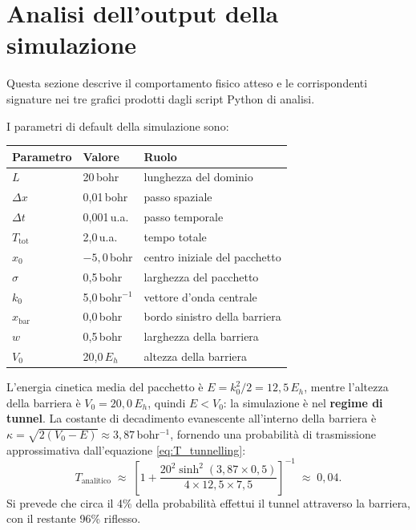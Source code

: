 \documentclass[12pt, a4paper]{article}
\newcommand{\dt}{\Delta t}
\newcommand{\dx}{\Delta x}
\begin{document}
\section{Analisi dell'output della simulazione}

Questa sezione descrive il comportamento fisico atteso e le corrispondenti
signature nei tre grafici prodotti dagli script Python di analisi.

I parametri di default della simulazione sono:
\begin{center}
\begin{tabular}{lll}
\hline
Parametro & Valore & Ruolo \\
\hline
$L$ & 20\,bohr & lunghezza del dominio \\
$\dx$ & 0,01\,bohr & passo spaziale \\
$\dt$ & 0,001\,u.a. & passo temporale \\
$T_\text{tot}$ & 2,0\,u.a. & tempo totale \\
$x_0$ & $-5{,}0$\,bohr & centro iniziale del pacchetto \\
$\sigma$ & 0,5\,bohr & larghezza del pacchetto \\
$k_0$ & 5,0\,bohr$^{-1}$ & vettore d'onda centrale \\
$x_\text{bar}$ & 0,0\,bohr & bordo sinistro della barriera \\
$w$ & 0,5\,bohr & larghezza della barriera \\
$V_0$ & 20,0\,$E_h$ & altezza della barriera \\
\hline
\end{tabular}
\end{center}

L'energia cinetica media del pacchetto è $E = k_0^2/2 = 12{,}5\,E_h$, mentre
l'altezza della barriera è $V_0 = 20{,}0\,E_h$, quindi $E < V_0$: la simulazione
è nel \textbf{regime di tunnel}. La costante di decadimento evanescente
all'interno della barriera è $\kappa = \sqrt{2(V_0-E)} \approx 3{,}87$\,bohr$^{-1}$,
fornendo una probabilità di trasmissione approssimativa dall'equazione
\eqref{eq:T_tunnelling}:
\begin{equation}
  T_\text{analitico} \;\approx\;
  \left[1 + \frac{20^2\sinh^2(3{,}87\times 0{,}5)}{4\times 12{,}5\times 7{,}5}
  \right]^{-1}
  \;\approx\; 0{,}04.
  \label{eq:T_predicted}
\end{equation}
Si prevede che circa il 4\% della probabilità effettui il tunnel attraverso
la barriera, con il restante 96\% riflesso.
\end{document}
